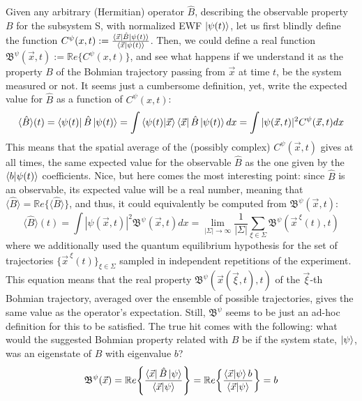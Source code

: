 \documentclass[11pt, a4paper]{article} %
\newcommand{\B}{\mathfrak{B}}
\begin{document}
Given any arbitrary (Hermitian) operator $\hat{B}$, describing the observable property $B$ for the subsystem S, with normalized EWF $\ket{\psi(t)}$, let us first blindly define the function $C^{\psi}(x,t):=\frac{\bra{\vec{x}}\hat{B}\ket{\psi(t)}}{\bra{\vec{x}}\ket{\psi(t)}}$. Then, we could define a real function $\B^\psi(\vec{x},t):=\mathbb{R}e\{C^{\psi}(x,t)\}$, and see what happens if we understand it as the property $B$ of the Bohmian trajectory passing from $\vec{x}$ at time $t$, be the system measured or not. It seems just a cumbersome definition, yet, write the expected value for $\hat{B}$  as a function of $C^\psi(x,t)$:
\begin{equation}
\langle \hat{B}\rangle(t)= \bra{\psi(t)}\hat{B}\ket{\psi(t)}=\int \bra{\psi(t)} \ket{\vec{x}}\bra{\vec{x}}\hat{B}\ket{\psi(t)}dx =  \int |\psi(\vec{x},t)|^2C^\psi(\vec{x},t)dx
\end{equation}
This means that the spatial average of the (possibly complex) $C^\psi(\vec{x},t)$ gives at all times, the same expected value for the observable $\hat{B}$ as the one given by the $\bra{b}\ket{\psi(t)}$ coefficients. Nice, but here comes the most interesting point: since $\hat{B}$ is an observable, its expected value will be a real number, meaning that $\langle \hat{B}\rangle=\mathbb{R}e\{\langle \hat{B}\rangle\}$, and thus, it could equivalently be computed from $\B^\psi(\vec{x},t)$:
\begin{equation}
\langle \hat{B}\rangle(t)=\int |\psi(\vec{x},t)|^2\B^\psi(\vec{x},t)dx= \lim_{|\Sigma|\rightarrow \infty}\frac{1}{|\Sigma|} \sum_{\xi\in\Sigma} \B^\psi(\vec{x}^{\:\xi}(t),t)
\end{equation}
where we additionally used the quantum equilibrium hypothesis \cite{Absolute} for the set of trajectories $\{\vec{x}^{\:\xi}(t)\}_{\xi\in\Sigma}$ sampled in independent repetitions of the experiment. This equation means that the real property $\B^\psi(\vec{x}(\vec{\xi},t),t)$ of the $\vec{\xi}$-th Bohmian trajectory, averaged over the ensemble of possible trajectories, gives the same value as the operator's expectation. Still, $\B^\psi$ seems to be just an ad-hoc definition for this to be satisfied. The true hit comes with the following: what would the suggested Bohmian property related with $B$ be if the system state, $\ket{\psi}$, was an eigenstate of $\hat{B}$ with eigenvalue $b$?
\begin{equation}
\B^\psi(\vec{x})=\mathbb{R}e\qty{ \frac{\bra{\vec{x}}\hat{B}\ket{\psi}}{\bra{\vec{x}}\ket{\psi}} } = \mathbb{R}e\qty{ \frac{\bra{\vec{x}}\ket{\psi}b}{\bra{\vec{x}}\ket{\psi}} }=b
\end{equation}
\end{document}
